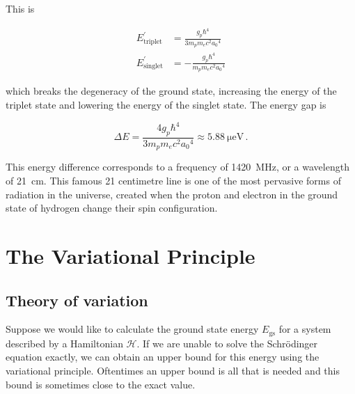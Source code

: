 \documentclass[12pt, titlepage]{article}
\begin{document}
This is

\begin{subequations}
	\begin{align}
	E_\text{triplet}^\prime &= \frac{g_p\hbar^4}{3 m_p m_e c^2 {a_0}^4} \\[4pt]
	E_\text{singlet}^\prime &= -\frac{g_p\hbar^4}{ m_p m_e c^2 {a_0}^4}
	\end{align}
\end{subequations}

which breaks the degeneracy of the ground state, increasing the energy of the triplet state and lowering the energy of the singlet state. The energy gap is

\begin{equation*}
\Delta E = \frac{4 g_p \hbar^4}{3 m_p m_e c^2 {a_0}^4} \approx \SI{5.88}{\micro\eV} \,.
\end{equation*}

This energy difference corresponds to a frequency of \SI{1420}{\mega\hertz}, or a wavelength of \SI{21}{\centi\metre}. This famous 21 centimetre line is one of the most pervasive forms of radiation in the universe, created when the proton and electron in the ground state of hydrogen change their spin configuration. 

\section{The Variational Principle}
\subsection{Theory of variation}
Suppose we would like to calculate the ground state energy $E_\text{gs}$ for a system described by a Hamiltonian $\mathcal{H}$. If we are unable to solve the Schrödinger equation exactly, we can obtain an upper bound for this energy using the variational principle. Oftentimes an upper bound is all that is needed and this bound is sometimes close to the exact value.
\end{document}

